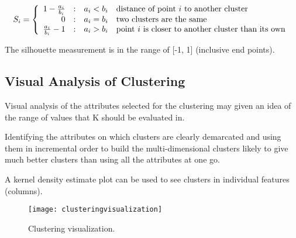 	\begin{equation}
		S_i = \left\{ \begin{array}{r@{\quad : \quad}ll}
									1-\frac{a_i}{b_i}    &   a_i < b_i  & \text{distance of point $i$ to another cluster}    \\
                                            0            &   a_i = b_i  & \text{two clusters are the same}    \\
                                    \frac{a_i}{b_i}-1    &   a_i > b_i  & \text{point $i$ is closer to another cluster than its own}    \\
                      \end{array}\right.
	\end{equation}

The silhouette measurement is in the range of [-1, 1] (inclusive end points).

	\subsection{Visual Analysis of Clustering}
	\begin{bulletedlist}
		\item Visual analysis of the attributes selected for the clustering may given an idea of the range of values that K should be evaluated in.
		\item Identifying the attributes on which clusters are clearly demarcated and using them in incremental order to build the multi-dimensional clusters likely to give much better clusters than using all the attributes at one go.
		\item A kernel density estimate plot can be used to see clusters in individual features (columns).
	\end{bulletedlist}

	\begin{figure}[htb]
		\centering
		\texttt{[image: clusteringvisualization]}
		\caption[Clustering visualization]{Clustering visualization.}
		\label{fig:clusteringvisualization}
	\end{figure}

